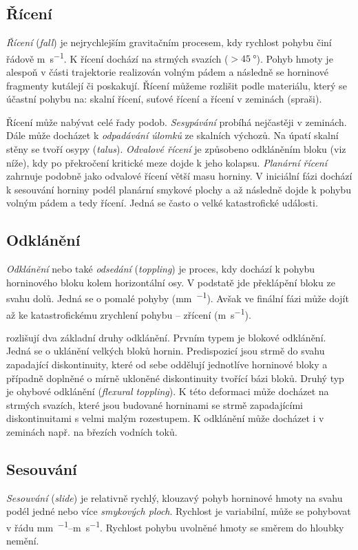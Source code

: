 \subsection{Řícení}
\emph{Řícení} (\textit{fall}) je nejrychlejším gravitačním procesem, kdy rychlost pohybu činí řádově \si{\metre\per\second}. K řícení dochází na strmých svazích ($>\SI{45}{\degree}$). Pohyb hmoty je alespoň v části trajektorie realizován volným pádem a následně se horninové fragmenty kutálejí či poskakují. Řícení můžeme rozlišit podle materiálu, který se účastní pohybu na: skalní řícení, suťové řícení a řícení v zeminách (spraši).

Řícení může nabývat celé řady podob. \emph{Sesypávání} probíhá nejčastěji v zeminách. Dále může docházet k \emph{odpadávání úlomků} ze skalních výchozů. Na úpatí skalní stěny se tvoří osypy (\textit{talus}). \emph{Odvalové řícení} je způsobeno odkláněním bloku (viz níže), kdy po překročení kritické meze dojde k jeho kolapsu. \emph{Planární řícení} zahrnuje podobně jako odvalové řícení větší masu horniny. V iniciální fázi dochází k sesouvání horniny podél planární smykové plochy a až následně dojde k pohybu volným pádem a tedy řícení. Jedná se často o velké katastrofické události.

\subsection{Odklánění}
\emph{Odklánění} nebo také \emph{odsedání} (\textit{toppling}) je proces, kdy dochází k pohybu horninového bloku kolem horizontální osy. V podstatě jde překlápění bloku ze svahu dolů. Jedná se o pomalé pohyby (\si{\milli\metre\per\rok}). Avšak ve finální fázi může dojít až ke katastrofickému zrychlení pohybu -- zřícení (\si{\metre\per\second}).

\textcite{goodmanTopplingRockSlopes1976} rozlišují dva základní druhy odklánění. Prvním typem je blokové odklánění. Jedná se o uklánění velkých bloků hornin. Predispozicí jsou strmě do svahu zapadající diskontinuity, které od sebe oddělují jednotlíve horninové bloky a případně doplněné o mírně ukloněné diskontinuity tvořící bázi bloků. Druhý typ je ohybové odklánění (\textit{flexural toppling}). K této deformaci může docházet na strmých svazích, které jsou budované horninami se strmě zapadajícími diskontinuitami s velmi malým rozestupem. K odklánění může docházet i v zeminách např. na březích vodních toků.

\subsection{Sesouvání}
\emph{Sesouvání} (\textit{slide}) je relativně rychlý, klouzavý pohyb horninové hmoty na svahu podél jedné nebo více \emph{smykových ploch}. Rychlost je variabilní, může se pohybovat v řádu \si{\milli\metre\per\rok}--\si{\metre\per\second}. Rychlost pohybu uvolněné hmoty se směrem do hloubky nemění.

